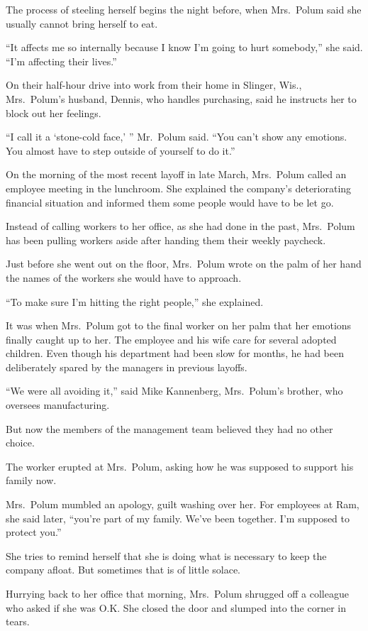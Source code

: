 \documentclass[12pt,a4paper,onecolumn]{article}
\begin{document}
The process of steeling herself begins the night before, when Mrs.~Polum said she usually cannot
bring herself to eat.

``It affects me so internally because I know I'm going to hurt somebody,'' she said. ``I'm affecting
their lives.''

On their half-hour drive into work from their home in Slinger, Wis., Mrs.~Polum's husband, Dennis,
who handles purchasing, said he instructs her to block out her feelings.

``I call it a `stone-cold face,' '' Mr.~Polum said. ``You can't show any emotions. You almost have
to step outside of yourself to do it.''

On the morning of the most recent layoff in late March, Mrs.~Polum called an employee meeting in the
lunchroom. She explained the company's deteriorating financial situation and informed them some
people would have to be let go.

Instead of calling workers to her office, as she had done in the past, Mrs.~Polum has been pulling
workers aside after handing them their weekly paycheck.

Just before she went out on the floor, Mrs.~Polum wrote on the palm of her hand the names of the
workers she would have to approach.

``To make sure I'm hitting the right people,'' she explained.

It was when Mrs.~Polum got to the final worker on her palm that her emotions finally caught up to
her. The employee and his wife care for several adopted children. Even though his department had
been slow for months, he had been deliberately spared by the managers in previous layoffs.

``We were all avoiding it,'' said Mike Kannenberg, Mrs.~Polum's brother, who oversees manufacturing.

But now the members of the management team believed they had no other choice.

The worker erupted at Mrs.~Polum, asking how he was supposed to support his family now.

Mrs.~Polum mumbled an apology, guilt washing over her. For employees at Ram, she said later,
``you're part of my family. We've been together. I'm supposed to protect you.''

She tries to remind herself that she is doing what is necessary to keep the company afloat. But
sometimes that is of little solace.

Hurrying back to her office that morning, Mrs.~Polum shrugged off a colleague who asked if she was
O.K. She closed the door and slumped into the corner in tears.
\end{document}
